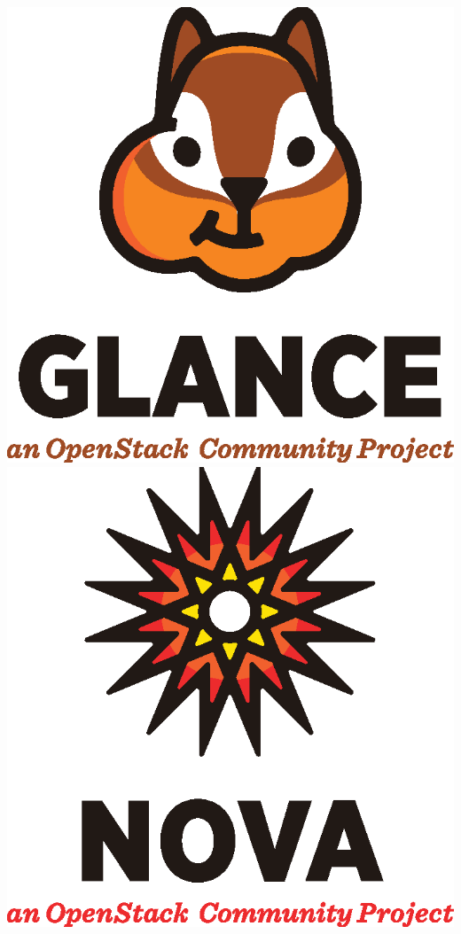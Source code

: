 \documentclass[aspectratio=169,11pt,hyperref={colorlinks=true}]{beamer}
\begin{document}
\begin{frame}
\begin{columns}[T]
\begin{column}{.48\textwidth}
            \includegraphics[height=.25\textheight]{mascots/glance.eps}\\
            \includegraphics[height=.25\textheight]{mascots/nova.eps}

\end{column}
\end{columns}
\end{frame}
\end{document}
